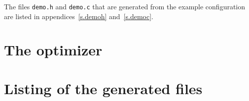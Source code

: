 \par
The files {\tt demo.h} and {\tt demo.c} that are generated from the
example configuration are listed
in appendices~\ref{s.demoh} and~\ref{s.democ}.
\section{The optimizer}
\section{Listing of the generated files}
